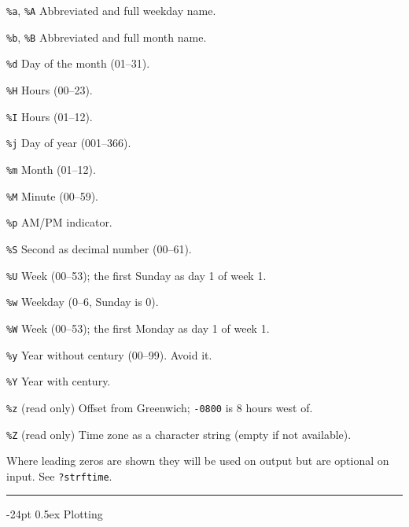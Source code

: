 \documentclass[8pt,landscape]{article}
\makeatletter
\renewcommand\section{\@startsection{section}{1}{0mm}%
                                     {-24pt}%
                                     {0.5ex}%
                                {\color{blue}\normalfont\large\bfseries}}
\newcommand{\code}{\texttt}
\newcommand{\describe}[1]{\begin{description}{#1}\end{description}}
\makeatother
\begin{document}
\begin{multicols*}{3}
  \describe{
\itemsep=0pt\parskip=0pt
    \item{\code{\%a}, \code{\%A}} {Abbreviated and full weekday name.}
    \item{\code{\%b}, \code{\%B}} {Abbreviated and full month name.}
    \item{\code{\%d}} {Day of the month (01--31).}
    \item{\code{\%H}} {Hours (00--23).}
    \item{\code{\%I}} {Hours (01--12).}
    \item{\code{\%j}} {Day of year (001--366).}
    \item{\code{\%m}} {Month (01--12).}
    \item{\code{\%M}} {Minute (00--59).}
    \item{\code{\%p}} {AM/PM indicator. }
    \item{\code{\%S}} {Second as decimal number (00--61).}
    \item{\code{\%U}} {Week (00--53); the first Sunday as day 1 of week 1.}
    \item{\code{\%w}} {Weekday (0--6, Sunday is 0).}
    \item{\code{\%W}} {Week (00--53); the first Monday as day 1 of week 1.}
    \item{\code{\%y}} {Year without century (00--99). Avoid it.}
    \item{\code{\%Y}} {Year with century.}
    \item{\code{\%z}} {(read only) Offset from Greenwich; \code{-0800} 
        is 8 hours west of.}
    \item{\code{\%Z}} {(read only) Time zone as a character string 
        (empty if not available).}
  }

Where leading zeros are shown they will be used on output but are
optional on input. See \code{?strftime}.  


\bigskip




\rule{.3\textwidth}{0.4pt}


\section{Plotting}


\end{multicols*}
\end{document}
